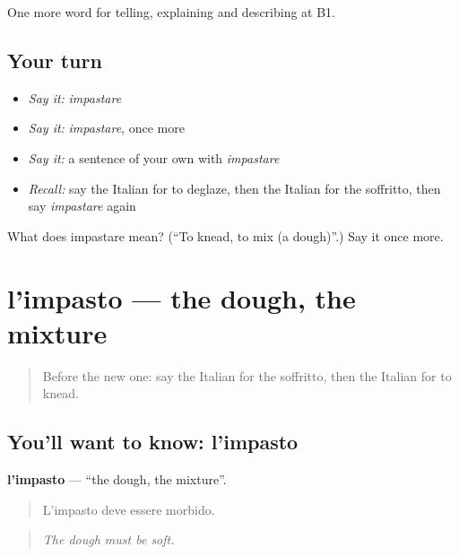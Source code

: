 \begin{grammarlens}[title={What you've built}]
One more word for telling, explaining and describing at B1.
\end{grammarlens}

\subsection*{Your turn}
\begin{itemize}
\raggedright
  \item \emph{Say it:} \emph{impastare}
  \item \emph{Say it:} \emph{impastare}, once more
  \item \emph{Say it:} a sentence of your own with \emph{impastare}
  \item \emph{Recall:} say the Italian for to deglaze, then the Italian for the soffritto, then say \emph{impastare} again
\end{itemize}

\begin{tcolorbox}[breakable,colback=teal!4,colframe=teal!35!black,title={Before you move on}]
What does impastare mean? (\textquotedblleft{}To knead, to mix (a dough)\textquotedblright{}.) Say it once more.
\end{tcolorbox}
\section[l'impasto]{l'impasto — the dough, the mixture}

\label{lesson:IT-C335-impasto}



\begin{quote}
Before the new one: say the Italian for the soffritto, then the Italian for to knead.
\end{quote}

\subsection*{You'll want to know: l'impasto}
\textbf{l'impasto} — \textquotedblleft{}the dough, the mixture\textquotedblright{}.

\begin{quote}
L'impasto deve essere morbido.
\end{quote}

\begin{quote}
\emph{The dough must be soft.}
\end{quote}

